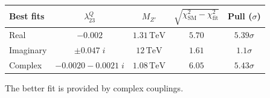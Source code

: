 \documentclass[mathserif, 10pt, dvipsnames]{beamer}
\begin{document}
\begin{frame}
\begin{figure}
    \end{figure}
    \begin{table}
        \centering
\begin{tabular}{|l|c|c|c|c|}\hline
\textbf{Best fits} & $\lambda^Q_{23}$                                  & $M_{Z'}$
& $\sqrt{\chi^2_\mathrm{SM} - \chi^2_\mathrm{fit}}$ & Pull ($\sigma$)                                      \\\hline
Real               & $-0.002$                                          & $1.31\,\mathrm{TeV}$ & $5.70$ & \alert{$5.39\sigma$} \\\hline
Imaginary          & $\pm 0.047\;i$                                    & $12\,\mathrm{TeV}$   & $1.61$ & \alert{$1.1\sigma$}  \\\hline
Complex            & $-0.0020-0.0021\;i$                               & $1.08\,\mathrm{TeV}$ & $6.05$ & \alert{$5.43\sigma$} \\\hline
        \end{tabular}
    \end{table}

    The better fit is provided by complex couplings.
\end{frame}
\end{document}
